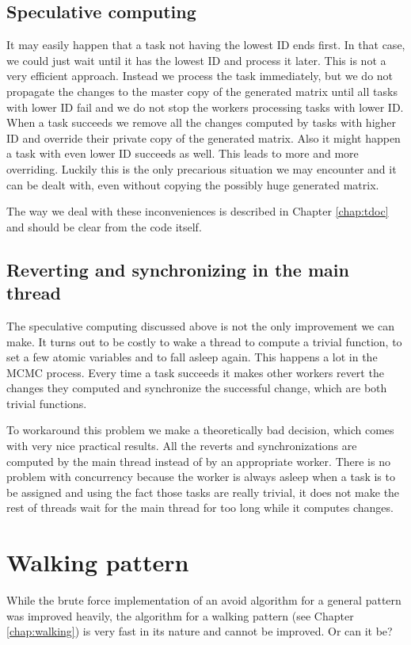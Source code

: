 \subsection{Speculative computing}
It may easily happen that a task not having the lowest ID ends first. In that case, we could just wait until it has the lowest ID and process it later. This is not a very efficient approach. Instead we process the task immediately, but we do not propagate the changes to the master copy of the generated matrix until all tasks with lower ID fail and we do not stop the workers processing tasks with lower ID. When a task succeeds we remove all the changes computed by tasks with higher ID and override their private copy of the generated matrix. Also it might happen a task with even lower ID succeeds as well. This leads to more and more overriding. Luckily this is the only precarious situation we may encounter and it can be dealt with, even without copying the possibly huge generated matrix.

The way we deal with these inconveniences is described in Chapter \ref{chap:tdoc} and should be clear from the code itself.

\subsection{Reverting and synchronizing in the main thread}
The speculative computing discussed above is not the only improvement
we can make. It turns out to be costly to wake a thread to compute a trivial function, to set a few atomic variables and to fall asleep again. This happens a lot in the MCMC process. Every time a task succeeds it makes other workers revert the changes they computed and synchronize the successful change, which are both trivial functions.

To workaround this problem we make a theoretically bad decision, which comes with very nice practical results. All the reverts and synchronizations are computed by the main thread instead of by an appropriate worker. There is no problem with concurrency because the worker is always asleep when a task is to be assigned and using the fact those tasks are really trivial, it does not make the rest of threads wait for the main thread for too long while it computes changes.

\section{Walking pattern}
While the brute force implementation of an avoid algorithm for a general pattern was improved heavily, the algorithm for a walking pattern (see Chapter \ref{chap:walking}) is very fast in its nature and cannot be improved. Or can it be?

